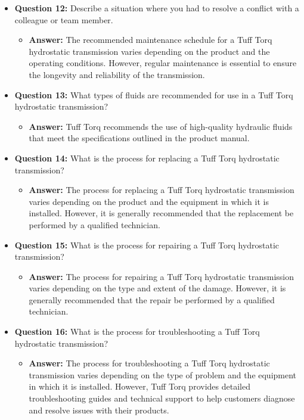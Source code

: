 \documentclass{article}
\begin{document}
\begin{itemize}
    \item \textbf{Question 12:} Describe a situation where you had to resolve a conflict with a colleague or team member.
    \begin{itemize}
        \item \textbf{Answer:} The recommended maintenance schedule for a Tuff Torq hydrostatic transmission varies depending on the product and the operating conditions. However, regular maintenance is essential to ensure the longevity and reliability of the transmission.
    \end{itemize}
    
    \item \textbf{Question 13:} What types of fluids are recommended for use in a Tuff Torq hydrostatic transmission?
    \begin{itemize}
        \item \textbf{Answer:} Tuff Torq recommends the use of high-quality hydraulic fluids that meet the specifications outlined in the product manual.
    \end{itemize}
    
    \item \textbf{Question 14:} What is the process for replacing a Tuff Torq hydrostatic transmission?
    \begin{itemize}
        \item \textbf{Answer:} The process for replacing a Tuff Torq hydrostatic transmission varies depending on the product and the equipment in which it is installed. However, it is generally recommended that the replacement be performed by a qualified technician.
    \end{itemize}
    
    \item \textbf{Question 15:} What is the process for repairing a Tuff Torq hydrostatic transmission?
    \begin{itemize}
        \item \textbf{Answer:} The process for repairing a Tuff Torq hydrostatic transmission varies depending on the type and extent of the damage. However, it is generally recommended that the repair be performed by a qualified technician.
    \end{itemize}
    
    \item \textbf{Question 16:} What is the process for troubleshooting a Tuff Torq hydrostatic transmission?
    \begin{itemize}
        \item \textbf{Answer:} The process for troubleshooting a Tuff Torq hydrostatic transmission varies depending on the type of problem and the equipment in which it is installed. However, Tuff Torq provides detailed troubleshooting guides and technical support to help customers diagnose and resolve issues with their products.
    \end{itemize}
    

\end{itemize}
\end{document}

